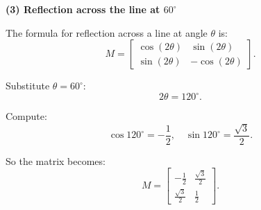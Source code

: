 \documentclass{ximera}
\begin{document}
\begin{exercise}
\textbf{(3) Reflection across the line at $60^\circ$}

The formula for reflection across a line at angle $\theta$ is:
\[
M = \begin{bmatrix} \cos(2\theta) & \sin(2\theta) \\ \sin(2\theta) & -\cos(2\theta) \end{bmatrix}.
\]

Substitute $\theta = 60^\circ$:
\[
2\theta = 120^\circ.
\]

Compute:
\[
\cos 120^\circ = -\frac{1}{2}, \quad \sin 120^\circ = \frac{\sqrt{3}}{2}.
\]

So the matrix becomes:
\[
M = \begin{bmatrix} -\frac{1}{2} & \frac{\sqrt{3}}{2} \\[6pt] \frac{\sqrt{3}}{2} & \frac{1}{2} \end{bmatrix}.
\]

\end{exercise}
\end{document}
